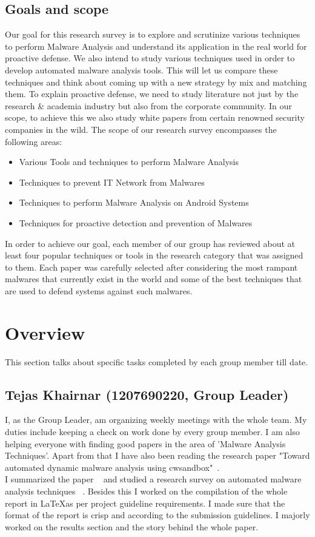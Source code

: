 \documentclass[11pt]{article}
\begin{document}
	\subsection{Goals and scope}
	Our goal for this research survey is to explore and scrutinize various techniques to perform Malware Analysis and understand its application in the real world for proactive defense. We also intend to study various techniques used in order to develop automated malware analysis tools. This will let us compare these techniques and think about coming up with a new strategy by mix and matching them. To explain proactive defense, we need to study literature not just by the research \& academia industry but also from the corporate community. In our scope, to achieve this we also study white papers from certain renowned security companies in the wild. 
	The scope of our research survey encompasses the following areas:
	\begin{itemize}[noitemsep]
		\item{Various Tools and techniques to perform Malware Analysis}
		\item{Techniques to prevent IT Network from Malwares} 
		\item{Techniques to perform Malware Analysis on Android Systems}
		\item{Techniques for proactive detection and prevention of Malwares}
	\end{itemize}
	In order to achieve our goal, each member of our group has reviewed about at least four popular techniques or tools in the research category that was assigned to them. Each paper was carefully selected after considering the most rampant malwares that currently exist in the world and some of the best techniques that are used to defend systems against such malwares.

\section{Overview}
This section talks about specific tasks completed by each group member till date.
\subsection{Tejas Khairnar (1207690220, Group Leader)}
I, as the Group Leader, am organizing weekly meetings with the whole team. My duties include keeping a check on work done by every group member.
I am also helping everyone with finding good papers in the area of 'Malware Analysis Techniques'. Apart from that I have also been reading the research paper "Toward automated dynamic malware analysis using cwsandbox"~\cite{willems2007toward}. \\
I summarized the paper ~\cite{willems2007toward} and studied a research survey on automated malware analysis techniques ~\cite{egele2012survey}. Besides this I worked on the compilation of the whole report in \LaTeX as per project guideline requirements. I made sure that the format of the report is crisp and according to the submission guidelines. I majorly worked on the results section and the story behind the whole paper. 
\end{document}
